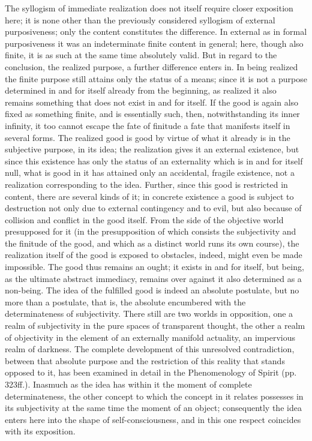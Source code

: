 The syllogism of immediate realization
does not itself require closer exposition here;
it is none other than the previously considered syllogism
of external purposiveness;
only the content constitutes the difference.
In external as in formal purposiveness
it was an indeterminate finite content in general;
here, though also finite,
it is as such at the same time absolutely valid.
But in regard to the conclusion, the realized purpose,
a further difference enters in.
In being realized the finite purpose
still attains only the status of a means;
since it is not a purpose
determined in and for itself
already from the beginning,
as realized it also remains
something that does not
exist in and for itself.
If the good is again also
fixed as something finite,
and is essentially such, then,
notwithstanding its inner infinity,
it too cannot escape the fate of finitude
a fate that manifests itself in several forms.
The realized good is good by virtue of
what it already is in the subjective purpose, in its idea;
the realization gives it an external existence,
but since this existence has only the status of
an externality which is in and for itself null,
what is good in it has attained only
an accidental, fragile existence,
not a realization corresponding to the idea.
Further, since this good is restricted in content,
there are several kinds of it;
in concrete existence a good is subject to destruction
not only due to external contingency and to evil,
but also because of collision and conflict in the good itself.
From the side of the objective world presupposed for it
(in the presupposition of which consists
the subjectivity and the finitude of the good,
and which as a distinct world runs its own course),
the realization itself of the good
is exposed to obstacles, indeed,
might even be made impossible.
The good thus remains an ought;
it exists in and for itself,
but being, as the ultimate abstract immediacy,
remains over against it also determined as a non-being.
The idea of the fulfilled good is
indeed an absolute postulate,
but no more than a postulate, that is,
the absolute encumbered with
the determinateness of subjectivity.
There still are two worlds in opposition,
one a realm of subjectivity in
the pure spaces of transparent thought,
the other a realm of objectivity in
the element of an externally manifold actuality,
an impervious realm of darkness.
The complete development of this unresolved contradiction,
between that absolute purpose
and the restriction of this reality
that stands opposed to it,
has been examined in detail in
the Phenomenology of Spirit (pp. 323ff.).
Inasmuch as the idea has within it
the moment of complete determinateness,
the other concept to which the concept in
it relates possesses in its subjectivity
at the same time the moment of an object;
consequently the idea enters here into
the shape of self-consciousness,
and in this one respect
coincides with its exposition.

